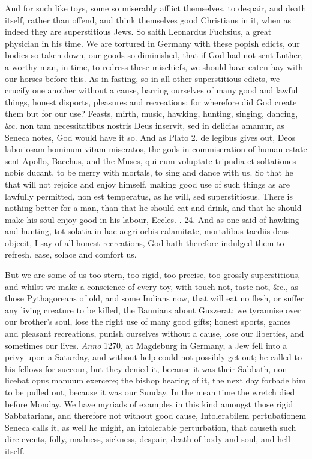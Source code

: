 {And for such like toys, some so miserably afflict themselves, to
despair, and death itself, rather than offend, and think themselves
good Christians in it, when as indeed they are superstitious Jews. So
saith Leonardus Fuchsius, a great physician in his time. We are
tortured in Germany with these popish edicts, our bodies so taken down,
our goods so diminished, that if God had not sent Luther, a worthy man,
in time, to redress these mischiefs, we should have eaten hay with our
horses before this. As in fasting, so in all other superstitious
edicts, we crucify one another without a cause, barring ourselves of
many good and lawful things, honest disports, pleasures and
recreations; for wherefore did God create them but for our use? Feasts,
mirth, music, hawking, hunting, singing, dancing, \&c. non tam
necessitatibus nostris Deus inservit, sed in delicias amamur, as Seneca
notes, God would have it so. And as Plato 2. de legibus gives out, Deos
laboriosam hominum vitam miseratos, the gods in commiseration of human
estate sent Apollo, Bacchus, and the Muses, qui cum voluptate tripudia
et soltationes nobis ducant, to be merry with mortals, to sing and
dance with us. So that he that will not rejoice and enjoy himself,
making good use of such things as are lawfully permitted, non est
temperatus, as he will, sed superstitiosus. There is nothing better for
a man, than that he should eat and drink, and that he should make his
soul enjoy good in his labour, Eccles. . 24. And as one said of
hawking and hunting, tot solatia in hac aegri orbis calamitate,
mortalibus taediis deus objecit, I say of all honest recreations, God
hath therefore indulged them to refresh, ease, solace and comfort us.

But we are some of us too stern, too rigid, too precise, too grossly
superstitious, and whilst we make a conscience of every toy, with touch
not, taste not, \&c., as those Pythagoreans of old, and some Indians
now, that will eat no flesh, or suffer any living creature to be
killed, the Bannians about Guzzerat; we tyrannise over our brother's
soul, lose the right use of many good gifts; honest sports, games
and pleasant recreations, punish ourselves without a cause, lose
our liberties, and sometimes our lives. \emph{Anno} 1270, at Magdeburg
in Germany, a Jew fell into a privy upon a Saturday, and without help
could not possibly get out; he called to his fellows for succour, but
they denied it, because it was their Sabbath, non licebat opus manuum
exercere; the bishop hearing of it, the next day forbade him to be
pulled out, because it was our Sunday. In the mean time the wretch died
before Monday. We have myriads of examples in this kind amongst those
rigid Sabbatarians, and therefore not without good cause,
Intolerabilem pertubationem Seneca calls it, as well he might, an
intolerable perturbation, that causeth such dire events, folly,
madness, sickness, despair, death of body and soul, and hell itself.

}
